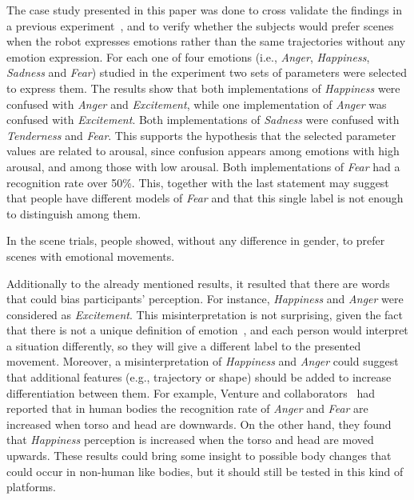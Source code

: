 The case study presented in this paper was done to cross validate the findings in a previous experiment~\cite{Angel2017-2}, and to verify whether the subjects would prefer scenes when the robot expresses emotions rather than the same trajectories without any emotion expression. For each one of four emotions (i.e., \textit{Anger}, \textit{Happiness}, \textit{Sadness} and \textit{Fear}) studied in the experiment two sets of parameters were selected to express them. The results show that both implementations of \textit{Happiness} were confused with \textit{Anger} and \textit{Excitement}, while one implementation of \textit{Anger} was confused with \textit{Excitement}. Both implementations of \textit{Sadness} were confused with \textit{Tenderness} and \textit{Fear}. This supports the hypothesis that the selected parameter values are related to arousal, since confusion appears among emotions with high arousal, and among those with low arousal. Both implementations of \textit{Fear} had a recognition rate over 50\%. This, together with the last statement may suggest that people have different models of \textit{Fear} and that this single label is not enough to distinguish among them. 

In the scene trials, people showed, without any difference in gender, to prefer scenes with emotional movements.

Additionally to the already mentioned results, it resulted that there are words that could bias participants' perception. For instance, \textit{Happiness} and \textit{Anger} were considered as \textit{Excitement}. This misinterpretation is not surprising, given the fact that there is not a unique definition of emotion~\cite{Plutchik2001,cacioppo2000handbook}, and each person would interpret a situation differently, so they will give a different label to the presented movement. Moreover, a misinterpretation of \textit{Happiness} and \textit{Anger} could suggest that additional features (e.g., trajectory or shape) should be added to increase differentiation between them. For example, Venture and collaborators~\cite{Venture2014} had reported that in human bodies the recognition rate of \textit{Anger} and \textit{Fear} are increased when torso and head are downwards. On the other hand, they found that \textit{Happiness} perception is increased when the torso and head are moved upwards. These results could bring some insight to possible body changes that could occur in non-human like bodies, but it should still be tested in this kind of platforms.
 
